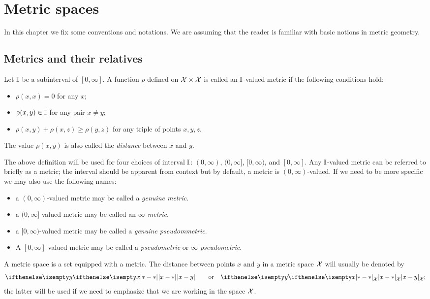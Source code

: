 \chapter{Metric spaces}
In this chapter we fix some conventions and notations. We are assuming that the reader is familiar with basic notions in metric geometry.

\section{Metrics and their relatives}
\label{sec:metric spaces}

Let $\mathbb{I}$ be a subinterval of $[0,\infty]$.
A function $\rho$ defined on $\spc{X}\times\spc{X}$ is called an $\mathbb{I}$-valued metric if the following conditions hold:
\begin{itemize}
 \item $\rho(x,x)=0$ for any $x$;
 \item $\rho(x,y)\in \II$ for any pair $x\ne y$;
 \item $\rho(x,y)+\rho(x,z)\ge \rho(y,z)$ for any triple of points $x,y, z$.
\end{itemize}
The value $\rho(x,y)$ is also called the \emph{distance} between $x$ and $y$.


The above definition will be used for four choices of interval $\mathbb{I}$: $(0,\infty)$, $(0,\infty]$, $[0,\infty)$, and $[0,\infty]$.
Any $\mathbb{I}$-valued metric can be referred to briefly as a metric;
the interval should be apparent from context but by default, a metric is $(0,\infty)$-valued. 
If we need to be more specific we may also use the following names:
\begin{itemize}
\item a $(0,\infty)$-valued metric may be called a \emph{genuine metric}.
\item a $(0,\infty]$-valued metric may be called an \emph{$\infty$-metric}.
\item a $[0,\infty)$-valued metric may be called  a \emph{genuine pseudommetric}.
\item A $[0,\infty]$-valued metric may be called a \emph{pseudometric} or \emph{$\infty$-pseudometric}.
\end{itemize}

A metric space is a set equipped with a metric.
The distance between points $x$ and $y$ in a metric space $\mathcal{X}$ will  usually be denoted by \[\dist{x}{y}{}\qquad\text{or}\quad \dist{x}{y}{\spc{X}};\]
the latter will be used if we need to emphasize that we are working in the space $\mathcal{X}$.

